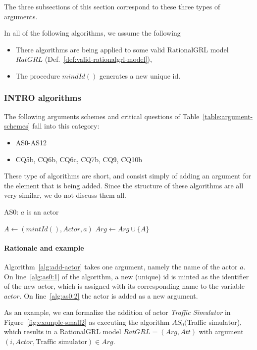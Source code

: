 The three subsections of this section correspond to these three types of arguments.

In all of the following algorithms, we assume the following
\begin{itemize}
\item There algorithms are being applied to some valid RationalGRL model $RatGRL$ (Def.~\ref{def:valid-rationalgrl-model}),
\item The procedure $mindId()$ generates a new unique id.
\end{itemize}

\subsubsection{INTRO algorithms}

The following arguments schemes and critical questions of Table~\ref{table:argument-schemes} fall into this category:
\begin{itemize}
\item AS0-AS12
\item CQ5b, CQ6b, CQ6c, CQ7b, CQ9, CQ10b
\end{itemize}

These type of algorithms are short, and consist simply of adding an argument for the element that is being added. Since the structure of these algorithms are all very similar, we do not discuss them all. 

\begin{algorithm}[h]
  \caption{AS0: $a$ is an actor}\label{alg:add-actor}
  \begin{algorithmic}[1]
    \State $A \leftarrow (mintId(), Actor, a)$ \label{alg:as0:1}
    \State $Arg\leftarrow Arg \cup \{A\}$\label{alg:as0:2}
    \EndProcedure
  \end{algorithmic}
\end{algorithm}

\paragraph{Rationale and example} Algorithm~\ref{alg:add-actor} takes one argument, namely the name of the actor $a$. On line~\ref{alg:as0:1} of the algorithm, a new (unique) id is minted as the identifier of the new actor, which is assigned with its corresponding name to the variable $actor$. On line~\ref{alg:as0:2} the actor is added as a new argument.

As an example, we can formalize the addition of actor \emph{Traffic Simulator} in Figure~\ref{fig:example-small2} as executing the algorithm $AS_0($Traffic simulator), which results in a RationalGRL model $RatGRL=(Arg,Att)$ with argument $(i, Actor, \text{Traffic simulator})\in Arg$.


